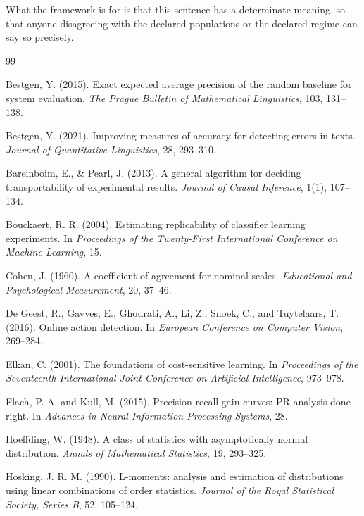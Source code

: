 \documentclass[11pt]{article}
\theoremstyle{remark}
\begin{document}
What the framework is for is that this sentence has a determinate meaning, so that anyone disagreeing with the declared populations or the declared regime can say so precisely.

\begin{thebibliography}{99}

Bestgen, Y. (2015).
Exact expected average precision of the random baseline for system evaluation.
\emph{The Prague Bulletin of Mathematical Linguistics}, 103, 131--138.

Bestgen, Y. (2021).
Improving measures of accuracy for detecting errors in texts.
\emph{Journal of Quantitative Linguistics}, 28, 293--310.

Bareinboim, E., \& Pearl, J. (2013).
A general algorithm for deciding transportability of experimental results.
\emph{Journal of Causal Inference}, 1(1), 107--134.

Bouckaert, R. R. (2004).
Estimating replicability of classifier learning experiments.
In \emph{Proceedings of the Twenty-First International Conference on Machine Learning}, 15.

Cohen, J. (1960).
A coefficient of agreement for nominal scales.
\emph{Educational and Psychological Measurement}, 20, 37--46.

De Geest, R., Gavves, E., Ghodrati, A., Li, Z., Snoek, C., and Tuytelaars, T. (2016).
Online action detection.
In \emph{European Conference on Computer Vision}, 269--284.

Elkan, C. (2001).
The foundations of cost-sensitive learning.
In \emph{Proceedings of the Seventeenth International Joint Conference on Artificial Intelligence}, 973--978.

Flach, P. A. and Kull, M. (2015).
Precision-recall-gain curves: PR analysis done right.
In \emph{Advances in Neural Information Processing Systems}, 28.

Hoeffding, W. (1948).
A class of statistics with asymptotically normal distribution.
\emph{Annals of Mathematical Statistics}, 19, 293--325.

Hosking, J. R. M. (1990).
L-moments: analysis and estimation of distributions using linear combinations of order statistics.
\emph{Journal of the Royal Statistical Society, Series B}, 52, 105--124.


\end{thebibliography}
\end{document}
